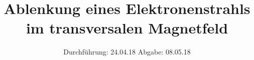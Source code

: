 

\subject{V502}
\title{Ablenkung eines Elektronenstrahls im transversalen Magnetfeld}
\date{
  Durchführung: 24.04.18
  \hspace{3em}
  Abgabe: 08.05.18
}



\maketitle
\thispagestyle{empty}
\tableofcontents
\newpage








\newpage
\printbibliography


